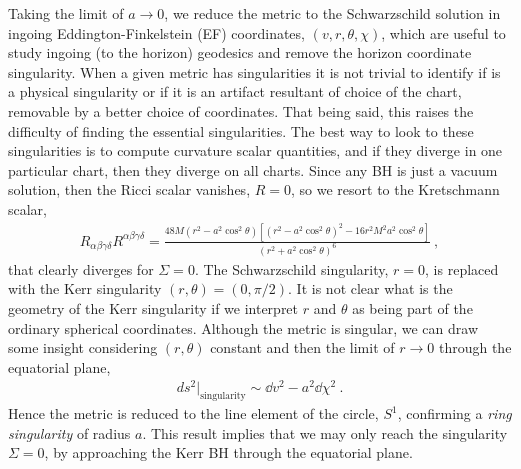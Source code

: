 Taking the limit of $a\to0$, we reduce the metric to the Schwarzschild solution in ingoing Eddington-Finkelstein (EF) coordinates, $(v,r,\theta,\chi)$, which are useful to study ingoing (to the horizon) geodesics and remove the horizon coordinate singularity.
When a given metric has singularities it is not trivial to identify if is a physical singularity or if it is an artifact resultant of choice of the chart, removable by a better choice of coordinates. 
That being said, this raises the difficulty of finding the essential singularities.
The best way to look to these singularities is to compute curvature scalar quantities, and if they diverge in one particular chart, then they diverge on all charts.
Since any BH is just a vacuum solution, then the Ricci scalar vanishes, $R=0$, so we resort to the Kretschmann scalar,
\begin{align}
    R_{\alpha\beta\gamma\delta} R^{\alpha\beta\gamma\delta} = \frac{48 M (r^2 - a^2\cos^2\theta) \left[ (r^2 - a^2\cos^2\theta) ^2 - 16 r^2 M^2 a^2\cos^2\theta \right] }{(r^2 + a^2\cos^2\theta)^6} ~,
    \label{eq2:KerrKretschmann}
\end{align}
that clearly diverges for $\Sigma=0$.
The Schwarzschild singularity, $r=0$, is replaced with the Kerr singularity $(r,\theta)=(0,\pi/2)$.
It is not clear what is the geometry of the Kerr singularity if we interpret $r$ and $\theta$ as being part of the ordinary spherical coordinates.
Although the metric is singular, we can draw some insight considering $(r,\theta)$ constant and then the limit of $r\to0$ through the equatorial plane,
\begin{align}
    {ds^2}\rvert_{\mathrm{singularity}} \sim \dd v^2 - a^2 \dd \chi^2 ~.
    \label{eq2:KerrKretschmann}
\end{align}
Hence the metric is reduced to the line element of the circle, $S^1$, confirming a \emph{ring singularity} of radius $a$.
This result implies that we may only reach the singularity $\Sigma=0$, by approaching the Kerr BH through the equatorial plane. 

